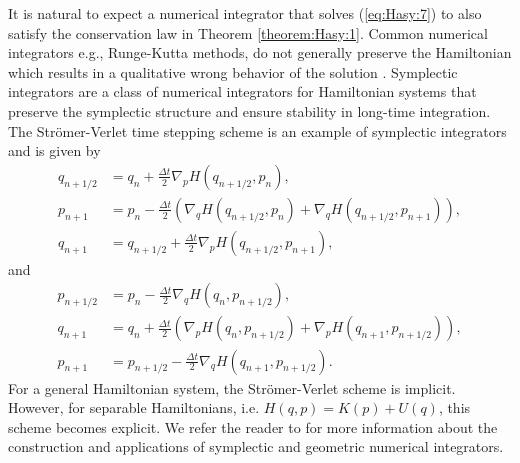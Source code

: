 {\edit It is natural to expect a numerical integrator that solves (\ref{eq:Hasy:7}) to also satisfy the conservation law in Theorem \ref{theorem:Hasy:1}. Common numerical integrators e.g., Runge-Kutta methods, do not generally preserve the Hamiltonian which results in a qualitative wrong behavior of the solution \cite{Hairer:1250576}. Symplectic integrators are a class of numerical integrators for Hamiltonian systems that preserve the symplectic structure and ensure stability in long-time integration.} The Str\"omer-Verlet time stepping scheme is an example of symplectic integrators and is given by
\begin{equation} \label{eq:Hasy:13}
\begin{aligned}
	q_{n+1/2} &= q_n + \frac{\Delta t}{2} \nabla_pH(q_{n+1/2},p_n), \\
	p_{n+1} &= p_n - \frac{\Delta t}{2} \left( \nabla_qH(q_{n+1/2},p_n) + \nabla_qH(q_{n+1/2},p_{n+1}) \right),\\
	q_{n+1} &= q_{n+1/2} + \frac{\Delta t}{2} \nabla_pH(q_{n+1/2},p_{n+1}),
\end{aligned}
\end{equation}
and
\begin{equation} \label{eq:Hasy:14}
\begin{aligned}
	p_{n+1/2} &= p_n - \frac{\Delta t}{2} \nabla_qH(q_{n},p_{n+1/2}), \\
	q_{n+1} &= q_n + \frac{\Delta t}{2} \left( \nabla_pH(q_{n},p_{n+1/2}) + \nabla_pH(q_{n+1},p_{n+1/2}) \right),\\
	p_{n+1} &= p_{n+1/2} - \frac{\Delta t}{2} \nabla_qH(q_{n+1},p_{n+1/2}).
\end{aligned}
\end{equation}
For a general Hamiltonian system, the Str\"omer-Verlet scheme is implicit. However, for separable Hamiltonians, i.e. $H(q,p) = K(p) + U(q)$, this {\edit scheme becomes} explicit. We refer the reader to \cite{Hairer:1250576} for more information about the construction and applications of symplectic and geometric numerical integrators. 
